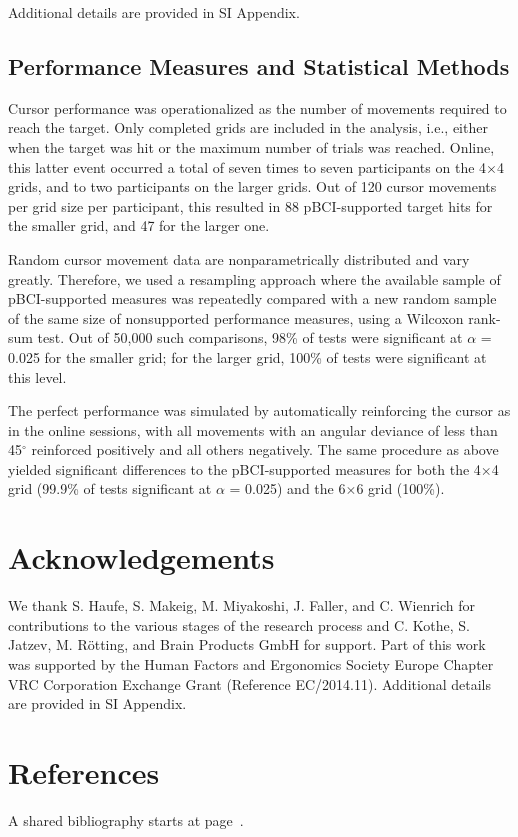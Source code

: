 Additional details are provided in SI Appendix.


\subsection{Performance Measures and Statistical Methods}
Cursor performance was operationalized as the number of movements required to reach the target. Only completed grids are included in the analysis, i.e., either when the target was hit or the maximum number of trials was reached. Online, this latter event occurred a total of seven times to seven participants on the 4$\times$4 grids, and to two participants on the larger grids. Out of 120 cursor movements per grid size per participant, this resulted in 88 pBCI-supported target hits for the smaller grid, and 47 for the larger one.

Random cursor movement data are nonparametrically distributed and vary greatly. Therefore, we used a resampling approach where the available sample of pBCI-supported measures was repeatedly compared with a new random sample of the same size of nonsupported performance measures, using a Wilcoxon rank-sum test. Out of 50,000 such comparisons, 98\% of tests were significant at $\alpha$ = 0.025 for the smaller grid; for the larger grid, 100\% of tests were significant at this level.

The perfect performance was simulated by automatically reinforcing the cursor as in the online sessions, with all movements with an angular deviance of less than 45$^{\circ}$ reinforced positively and all others negatively. The same procedure as above yielded significant differences to the pBCI-supported measures for both the 4$\times$4 grid (99.9\% of tests significant at $\alpha$ = 0.025) and the 6$\times$6 grid (100\%).


\section*{Acknowledgements}

We thank S. Haufe, S. Makeig, M. Miyakoshi, J. Faller, and C. Wienrich for contributions to the various stages of the research process and C. Kothe, S. Jatzev, M. Rötting, and Brain Products GmbH for support. Part of this work was supported by the Human Factors and Ergonomics Society Europe Chapter VRC Corporation Exchange Grant (Reference EC/2014.11).
Additional details are provided in SI Appendix.


\section*{References}

A shared bibliography starts at page~\pageref{bibliography}.


\clearpage
\pagestyle{plain}
